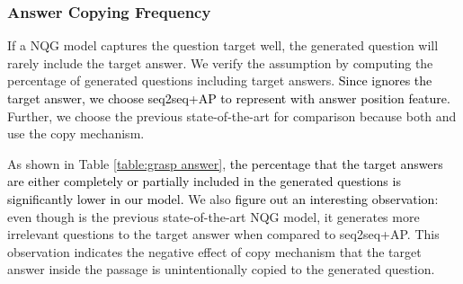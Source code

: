\documentclass[letterpaper]{article} %
\newcommand{\hh}[1]{\textcolor{black}{#1}}
\begin{document}
\subsubsection{Answer Copying Frequency}
% 
%  
% 
If a NQG model captures the question target well, the generated question will rarely include the target answer. We verify the assumption by computing the percentage of generated questions including target answers. \hh{Since \cite{du2017learning} ignores the target answer, we choose seq2seq+AP to represent \cite{du2017learning} with answer position feature. } Further, we choose the previous state-of-the-art \cite{song2018leveraging} for comparison because both \cite{zhou2017neural} and \cite{song2018leveraging} use the copy mechanism. 
% 
% 
% 
% 
% 
% 

As shown in Table \ref{table:grasp answer}, \hh{the percentage that the target answers are either completely or partially included in the generated questions is significantly lower in our model.} We also \hh{figure out an interesting observation}: even though \cite{song2018leveraging} is the previous state-of-the-art NQG model, it generates more irrelevant questions to the target answer when compared to seq2seq+AP. This observation indicates the negative effect of copy mechanism that the target answer inside the passage is unintentionally copied to the generated question.
% 
% 
% 
% 
\end{document}
